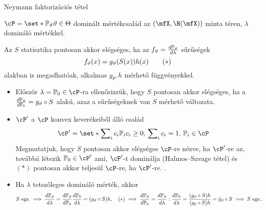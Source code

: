 \documentclass[aspectratio=169,notheorems,9pt,\option]{beamer}
\begin{document}
\begin{frame}{Neymann faktorizációs tétel}

  \begin{theorem}
    $\cP=\set*{\P[\theta]}{\theta\in\Theta}$ dominált mértékcsalád az 
    $(\mfX,\B(\mfX))$ minta téren, $\lambda$ domináló mértékkel. 
    
    Az $S$  statisztika pontosan akkor elégséges, ha az 
    $f_\theta=\frac{d\P[\theta]}{d\lambda}$ 
    sűrűségek
    \begin{displaymath}
      f_{\theta}(x)=g_{\theta}(S(x))h(x)  \tag{\hbox{${*}$}}
    \end{displaymath}
    alakban is megadhatóak, 
    alkalmas $g_\theta,h$ mérhető függvényekkel.
  \end{theorem}
  \begin{itemize}
    \item Először $\lambda=\P[0]\in\cP$-ra ellenőrizzük, hogy $S$ pontosan 
    akkor elégséges, ha a $\frac{d\P[\theta]}{d\P[0]}=g_\theta\circ S$ alakú, azaz
    a sűrűségeknek van $S$ mérhető változata.
    \item $\cP'$ a $\cP$ konvex keverékeiből álló család  
    \begin{displaymath}
      \cP'=\set*{\sum\nolimits_i c_i\P[i]}{c_i\geq0,\,\sum\nolimits_i c_i=1,\,\P[i]\in\cP}  
    \end{displaymath}
    Megmutatjuk, hogy $S$ pontosan akkor elégséges $\cP$-re nézve, ha $\cP'$-re az, 
    továbbá létezik $\P[0]\in \cP'$ ami, $\cP'$-t dominálja (Halmos--Savage tétel) 
    és $(*)$ pontosan akkor teljesül $\cP$-re, ha $\cP'$-re. .
    \item Ha $\lambda$ tetszőleges domináló mérték, akkor 
    \begin{displaymath}
      \text{$S$ egs.}\implies\frac{d\P[\theta]}{d\lambda}
      =\frac{d\P[\theta]}{d\P[0]}\frac{d\P[0]}{d\lambda}
      =(g_\theta\circ S) h,
      \quad\text{$(*)$}\implies
      \frac{d\P[\theta]}{d\P[0]}=\frac{d\P[\theta]}{d\lambda}:\frac{d\P[0]}{d\lambda}
      =\frac{(g_\theta\circ S) h}{(g_0\circ S) h}
      =\tilde g_\theta\circ S\implies \text{$S$ egs.}.
    \end{displaymath}
  \end{itemize}
  

\end{frame}
\end{document}
